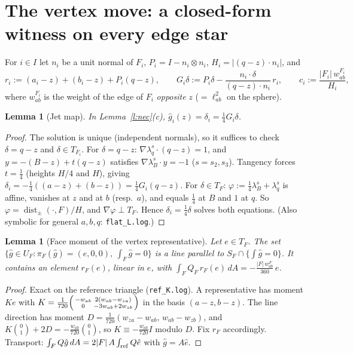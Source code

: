 \documentclass[11pt]{article}
\newtheorem{lemma}[theorem]{Lemma}
\theoremstyle{definition}
\newcommand{\gh}{\hat g}
\DeclareMathOperator{\dist}{dist}
\begin{document}
\section{The vertex move: a closed-form witness on every edge star}\label{s:vertex}
For $i\in I$ let $n_i$ be a unit normal of $F_i$, $P_i=I-n_i\otimes n_i$, $H_i=|(q-z)\cdot n_i|$, and
\[
r_i:=(a_i-z)+(b_i-z)+P_i(q-z),\qquad G_i\delta:=P_i\delta-\frac{n_i\cdot\delta}{(q-z)\cdot n_i}\,r_i,\qquad c_i:=\frac{|F_i|\,w^{F_i}_{ab}}{H_i},
\]
where $w_{ab}^{F_i}$ is the weight of the edge of $F_i$ \emph{opposite} $z$ ($=\ell_{ab}^2$ on the sphere).

\begin{lemma}[Jet map]\label{l:jet}
In Lemma~\ref{l:nec}(c), $\gh_i(z)=\delta_i=\frac14G_i\delta$.
\end{lemma}
\begin{proof}
The solution is unique (independent normals), so it suffices to check $\delta=q-z$ and $\delta\in T_{F_i}$. For $\delta=q-z$: $\nabla\lambda_q^{s}\cdot(q-z)=1$, and $y=-(B-z)+t(q-z)$ satisfies $\nabla\lambda_B^{s}\cdot y=-1$ ($s=s_2,s_3$). Tangency forces $t=\frac14$ (heights $H/4$ and $H$), giving $\delta_i=-\frac14((a-z)+(b-z))=\frac14G_i(q-z)$. For $\delta\in T_F$: $\varphi:=\frac14\lambda_B^{s}+\lambda_q^{s}$ is affine, vanishes at $z$ and at $b$ (resp.\ $a$), and equals $\frac14$ at $B$ and $1$ at $q$. So $\varphi=\dist_\pm(\cdot,F)/H$, and $\nabla\varphi\perp T_F$. Hence $\delta_i=\frac14\delta$ solves both equations. (Also symbolic for general $a,b,q$: \texttt{flat\_L.log}.)
\end{proof}

\begin{lemma}[Face moment of the vertex representative]\label{l:K}
Let $e\in T_F$. The set $\{\gh\in U_F:\pi_F(\gh)=(e,0,0),\ \int_F\gh=0\}$ is a line parallel to $S_F\cap\{\int\gh=0\}$. It contains an element $r_F(e)$, linear in $e$, with
$\int_FQ_F\,r_F(e)\,dA=-\frac{|F|\,w^F_{ab}}{360}\,e$.
\end{lemma}
\begin{proof}
Exact on the reference triangle (\texttt{ref\_K.log}). A representative has moment $K e$ with $K=\frac1{720}\begin{psmallmatrix}-w_{ab}&2(w_{ab}-w_{za})\\0&-3w_{ab}+2w_{zb}\end{psmallmatrix}$ in the basis $(a-z,b-z)$. The line direction has moment $D=\frac1{720}(w_{za}-w_{ab},\,w_{ab}-w_{zb})$, and $K\binom01+2D=-\frac{w_{ab}}{720}\binom01$, so $K\equiv-\frac{w_{ab}}{720}I$ modulo $D$. Fix $r_F$ accordingly. Transport: $\int_FQ\gh\,dA=2|F|\,A\int_{\rm ref}Q\hat e$ with $\gh=A\hat e$.
\end{proof}
\end{document}

